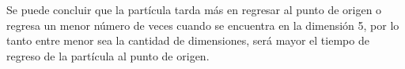 \documentclass[12pt]{amsart}
\begin{document}
\bigskip
Se puede concluir que la partícula tarda más en regresar al punto de origen o regresa un menor número de veces cuando se encuentra en la dimensión 5, por lo tanto entre menor sea la cantidad de dimensiones, será mayor el tiempo de regreso de la partícula al punto de origen.





\bigskip
\end{document}

